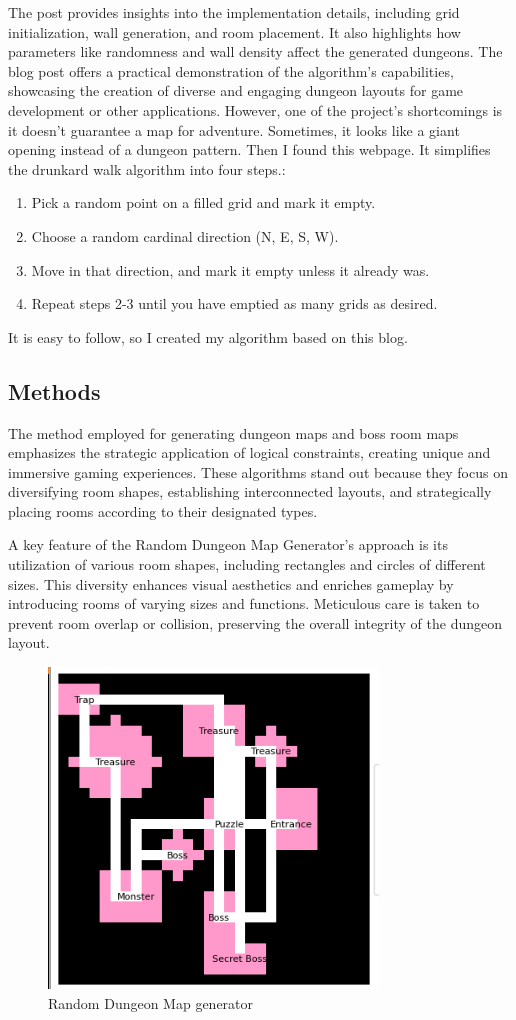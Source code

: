 \documentclass[10pt,twocolumn]{article}
\begin{document}
The post provides insights into the implementation details, including grid initialization, wall generation, and room placement. It also highlights how parameters like randomness and wall density affect the generated dungeons. The blog post offers a practical demonstration of the algorithm's capabilities, showcasing the creation of diverse and engaging dungeon layouts for game development or other applications. However, one of the project's shortcomings is it doesn't guarantee a map for adventure. Sometimes, it looks like a giant opening instead of a dungeon pattern.
Then I found this webpage. It simplifies the drunkard walk algorithm into four steps.:
\begin{enumerate}
    \item Pick a random point on a filled grid and mark it empty.
    \item Choose a random cardinal direction (N, E, S, W).
    \item Move in that direction, and mark it empty unless it already was.
    \item Repeat steps 2-3 until you have emptied as many grids as desired.\cite{pcgwiki_drunkardwalk}
\end{enumerate}

It is easy to follow, so I created my algorithm based on this blog.


\subsection{Methods}


The method employed for generating dungeon maps and boss room maps emphasizes the strategic application of logical constraints, creating unique and immersive gaming experiences. These algorithms stand out because they focus on diversifying room shapes, establishing interconnected layouts, and strategically placing rooms according to their designated types.

A key feature of the Random Dungeon Map Generator's approach is its utilization of various room shapes, including rectangles and circles of different sizes. This diversity enhances visual aesthetics and enriches gameplay by introducing rooms of varying sizes and functions. Meticulous care is taken to prevent room overlap or collision, preserving the overall integrity of the dungeon layout.

\begin{figure}
    \centering
    \includegraphics[width=0.5\linewidth]{mymap.png}
    \caption{Random Dungeon Map generator }
    \label{fig:enter-label}
\end{figure}
\end{document}
